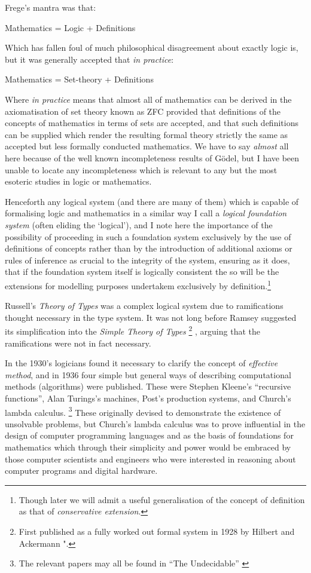 \documentclass[10pt,titlepage]{book}
\begin{document}
Frege's mantra was that:

\begin{center}
Mathematics = Logic + Definitions
\end{center}

Which has fallen foul of much philosophical disagreement about exactly logic is, but it was generally accepted that \emph{in practice}:

\begin{center}
Mathematics = Set-theory + Definitions
\end{center}

Where \emph{in practice} means that almost all of mathematics can be derived in the axiomatisation of set theory known as ZFC provided that definitions of the concepts of mathematics in terms of sets are accepted, and that such definitions can be supplied which render the resulting formal theory strictly the same as accepted but less formally conducted mathematics.
We have to say \emph{almost} all here because of the well known incompleteness results of G\"{o}del, but I have been unable to locate any incompleteness which is relevant to any but the most esoteric studies in logic or mathematics.

Henceforth any logical system (and there are many of them) which is capable of formalising logic and mathematics in a similar way I call a \emph{logical foundation system} (often eliding the `logical'), and I note here the importance of the possibility of proceeding in such a foundation system exclusively by the use of definitions of concepts rather than by the introduction of additional axioms or rules of inference as crucial to the integrity of the system, ensuring as it does, that if the foundation system itself is logically consistent the so will be the extensions for modelling purposes undertakem exclusively by definition.\footnote{
Though later we will admit a useful generalisation of the concept of definition as that of \emph{conservative extension}.}

Russell's \emph{Theory of Types} was a complex logical system due to ramifications thought necessary in the type system.
It was not long before Ramsey suggested its simplification into the \emph{Simple Theory of Types}%
\footnote{First published as a fully worked out formal system in 1928 by Hilbert and Ackermann "\cite{hilbert1928}.}%
, arguing that the ramifications were not in fact necessary.

In the 1930's logicians found it necessary to clarify the concept of \emph{effective method}, and in 1936 four simple but general ways of describing computational methods (algorithms) were published.
These were Stephen Kleene's ``recursive functions'', Alan Turings's machines, Post's production systems, and Church's lambda calculus.
\footnote{The relevant papers may all be found in ``The Undecidable'' \cite{davis65}}
These originally devised to demonstrate the existence of unsolvable problems, but Church's lambda calculus was to prove influential in the design of computer programming languages and as the basis of foundations for mathematics which through their simplicity and power would be embraced by those computer scientists and engineers who were interested in reasoning about computer programs and digital hardware.
\end{document}
